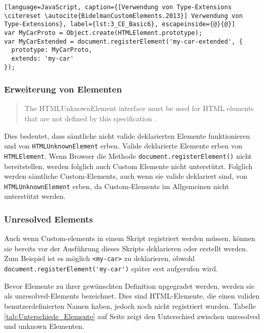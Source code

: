 \begin{lstlisting}[language=JavaScript, caption={[Verwendung von Type-Extensions \citereset \autocite{BidelmanCustomElements.2013}] Verwendung von Type-Extensions}, label={lst:3_CE_Basic6}, escapeinside={@}{@}]
var MyCarProto = Object.create(HTMLElement.prototype);
var MyCarExtended = document.registerElement('my-car-extended', {
  prototype: MyCarProto,
  extends: 'my-car'
});
\end{lstlisting}

\newpage
\subsubsection{Erweiterung von Elementen}

\begin{quote}
\glqq The HTMLUnknownElement interface must be used for HTML elements that are not defined by this specification \citereset \autocite{BidelmanCustomElements.2013}.\grqq
\end{quote}
Dies bedeutet, dass sämtliche nicht valide deklarierten Elemente funktionieren und von \lstinline|HTMLUnknownElement| erben. Valide deklarierte Elemente erben von \lstinline|HTMLElement|. Wenn Browser die Methode \lstinline|document.registerElement()| nicht bereitstellen, werden folglich auch Custom Elemente nicht unterstützt. Folglich werden sämtliche Custom-Elements, auch wenn sie valide deklariert sind, von \lstinline|HTMLUnknownElement| erben, da Custom-Elements im Allgemeinen nicht unterstützt werden.

\subsubsection{Unresolved Elements}

Auch wenn Custom-elements in einem Skript registriert werden müssen, können sie bereits vor der Ausführung dieses Skripts deklarieren oder erstellt werden. Zum Beispiel ist es möglich \lstinline|<my-car>| zu deklarieren, obwohl \lstinline|document.registerElement('my-car')| später erst aufgerufen wird.

Bevor Elemente zu ihrer gewünschten Definition upgegradet werden, werden sie als \glqq unresolved\grqq -Elements bezeichnet. Dies sind HTML-Elemente, die einen validen benutzerdefinierten Namen haben, jedoch noch nicht registriert wurden. Tabelle \ref{tab:Unterschiede_Elemente} auf Seite \pageref{tab:Unterschiede_Elemente} zeigt den Unterschied zwischen unresolved und unknown Elementen.


